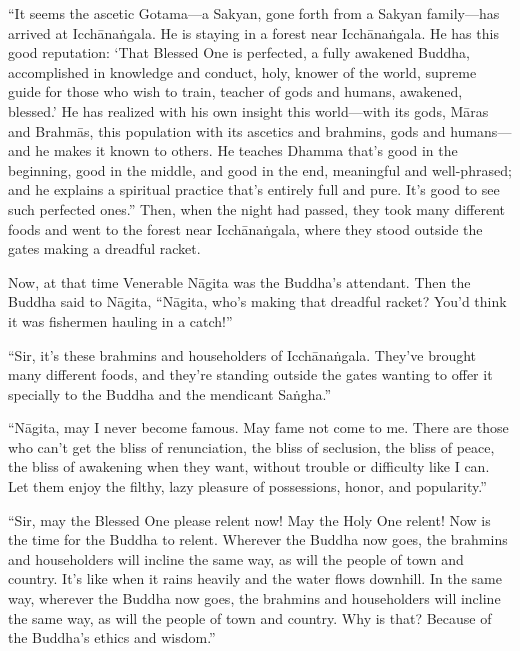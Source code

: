 \documentclass[12pt,openany]{book}%
\begin{document}
“It seems the ascetic Gotama—a Sakyan, gone forth from a Sakyan family—has arrived at \textsanskrit{Icchānaṅgala}. He is staying in a forest near \textsanskrit{Icchānaṅgala}. He has this good reputation: ‘That Blessed One is perfected, a fully awakened Buddha, accomplished in knowledge and conduct, holy, knower of the world, supreme guide for those who wish to train, teacher of gods and humans, awakened, blessed.’ He has realized with his own insight this world—with its gods, \textsanskrit{Māras} and \textsanskrit{Brahmās}, this population with its ascetics and brahmins, gods and humans—and he makes it known to others. He teaches Dhamma that’s good in the beginning, good in the middle, and good in the end, meaningful and well-phrased; and he explains a spiritual practice that’s entirely full and pure. It’s good to see such perfected ones.” Then, when the night had passed, they took many different foods and went to the forest near \textsanskrit{Icchānaṅgala}, where they stood outside the gates making a dreadful racket. 

Now, at that time Venerable \textsanskrit{Nāgita} was the Buddha’s attendant. Then the Buddha said to \textsanskrit{Nāgita}, “\textsanskrit{Nāgita}, who’s making that dreadful racket? You’d think it was fishermen hauling in a catch!” 

“Sir, it’s these brahmins and householders of \textsanskrit{Icchānaṅgala}. They’ve brought many different foods, and they’re standing outside the gates wanting to offer it specially to the Buddha and the mendicant \textsanskrit{Saṅgha}.” 

“\textsanskrit{Nāgita}, may I never become famous. May fame not come to me. There are those who can’t get the bliss of renunciation, the bliss of seclusion, the bliss of peace, the bliss of awakening when they want, without trouble or difficulty like I can. Let them enjoy the filthy, lazy pleasure of possessions, honor, and popularity.” 

“Sir, may the Blessed One please relent now! May the Holy One relent! Now is the time for the Buddha to relent. Wherever the Buddha now goes, the brahmins and householders will incline the same way, as will the people of town and country. It’s like when it rains heavily and the water flows downhill. In the same way, wherever the Buddha now goes, the brahmins and householders will incline the same way, as will the people of town and country. Why is that? Because of the Buddha’s ethics and wisdom.” 
\end{document}
